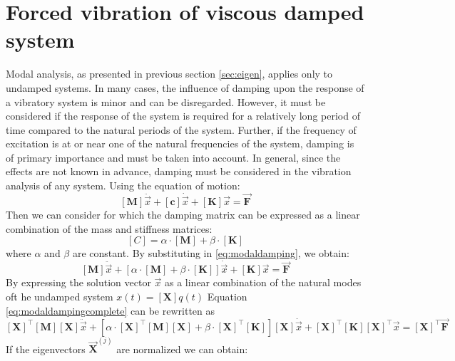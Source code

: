 \section{Forced vibration of viscous damped system}\label{sec:viscoussystem}
Modal analysis, as presented in previous section \ref{sec:eigen}, applies only
to undamped systems.
In many cases, the influence of damping upon the response of a vibratory system
is minor and can be disregarded. However, it must be considered if the response
of the system is required for a relatively long period of time compared to the
natural periods of the system. Further, if the frequency of excitation is at or
near one of the natural frequencies of the system, damping is of primary
importance and must be taken into account. In general, since the effects are not
known in advance, damping must be considered in the vibration analysis of any
system.
Using the equation of motion:
\begin{equation}\label{eq:modaldamping}
  [\mathbf{M}] \ddot{\vec{x}} + [\mathbf{c}] \dot{\vec{x}} +[\mathbf{K}] \vec{x}
   = \vec{\mathbf{F}}
\end{equation}
%
Then we can consider for which the damping matrix can be expressed as a linear
combination of the mass and stiffness matrices:
\begin{equation}
\label{eq:moadlpropdamping}
	[C] = \alpha \cdot [\mathbf{M}] + \beta \cdot [\mathbf{K}]
\end{equation}
where \(\alpha\) and \(\beta\) are constant. By substituting in
\eqref{eq:modaldamping}, we obtain:
\begin{equation}\label{eq:modaldampingcomplete}
	[\mathbf{M}] \ddot{\vec{x}} +
	[\alpha \cdot [\mathbf{M}] + \beta \cdot [\mathbf{K}]] \dot{\vec{x}} +
	[\mathbf{K}] \vec{x}= \vec{\mathbf{F}}
\end{equation}
By expressing the solution vector \(\vec{x}\) as a linear combination of the
natural modes oft he undamped system \(x(t) = [\mathbf{X}]q(t)\)
Equation \eqref{eq:modaldampingcomplete} can be rewritten as
\begin{equation}\label{eq:modaldampingcomplete}
	[\mathbf{X}]^{\top}[\mathbf{M}][\mathbf{X}] \ddot{\vec{x}} +
	[\alpha \cdot [\mathbf{X}]^{\top}[\mathbf{M}][\mathbf{X}] +
   \beta \cdot [\mathbf{X}]^{\top}[\mathbf{K}]][\mathbf{X}] \dot{\vec{x}} +
	[\mathbf{X}]^{\top}[\mathbf{K}][\mathbf{X}]^{\top} \vec{x} =
  [\mathbf{X}]^{\top}\vec{\mathbf{F}}
\end{equation}
%
If the eigenvectors \(\vec{\mathbf{X}}^{(j)}\) are normalized we can obtain:
